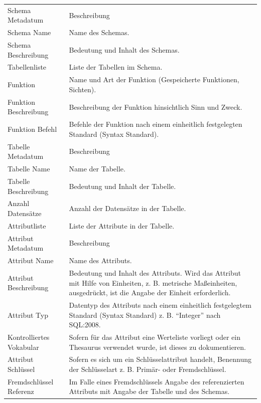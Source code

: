 \begin{center}
\begin{longtable}{L{0.3\textwidth} p{0.6\textwidth}}
		\midrule
		Schema Metadatum & Beschreibung\\
		Schema Name & Name des Schemas.\\
		Schema Beschreibung & Bedeutung und Inhalt des Schemas.\\
		Tabellenliste & Liste der Tabellen im Schema.\\
		Funktion & Name und Art der Funktion (Gespeicherte Funktionen, Sichten).\\
		Funktion Beschreibung & Beschreibung der Funktion hinsichtlich Sinn und Zweck.\\
		Funktion Befehl & Befehle der Funktion nach einem einheitlich festgelegten Standard (Syntax Standard).\\
		\midrule
		Tabelle Metadatum & Beschreibung\\
		Tabelle Name & Name der Tabelle.\\
		Tabelle Beschreibung & Bedeutung und Inhalt der Tabelle.\\
		Anzahl Datensätze & Anzahl der Datensätze in der Tabelle.\\
		Attributliste & Liste der Attribute in der Tabelle.\\
		\midrule
		Attribut Metadatum & Beschreibung\\
		Attribut Name & Name des Attributs.\\
		Attribut Beschreibung & Bedeutung und Inhalt des Attributs. Wird das Attribut mit Hilfe von Einheiten, z. B. metrische Maßeinheiten, ausgedrückt, ist die Angabe der Einheit erforderlich.\\
		Attribut Typ & Datentyp des Attributs nach einem einheitlich festgelegtem Standard (Syntax Standard) z. B. "`Integer"' nach SQL:2008.\\
		Kontrolliertes Vokabular & Sofern für das Attribut eine Werteliste vorliegt oder ein Thesaurus verwendet wurde, ist dieses zu dokumentieren.\\
		Attribut Schlüssel & Sofern es sich um ein Schlüsselattribut handelt, Benennung der Schlüsselart z. B. Primär- oder Fremdschlüssel. \\
		Fremdschlüssel Referenz & Im Falle eines Fremdschlüssels Angabe des referenzierten Attributs mit Angabe der Tabelle und des Schemas. \\

	  \bottomrule
	\end{longtable}
\end{center}



